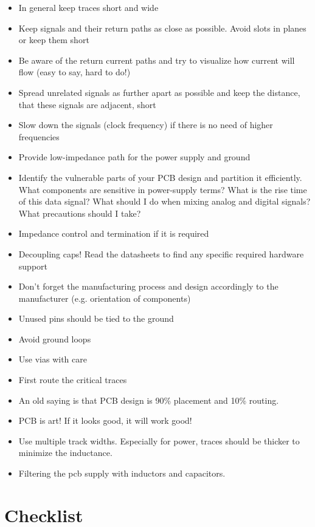 \documentclass[final]{cubedoc}
\begin{document}
	\begin{itemize}
		\item In general keep traces short and wide
		\item Keep signals and their return paths as close as possible. Avoid slots in planes or keep them short
		\item Be aware of the return current paths and try to visualize how current will flow (easy to say, hard to do!)
		\item Spread unrelated signals as further apart as possible and keep the distance, that these signals are adjacent, short
		\item Slow down the signals (clock frequency) if there is no need of higher frequencies
		\item Provide low-impedance path for the power supply and ground
		\item Identify the vulnerable parts of your PCB design and partition it efficiently. What components are sensitive in power-supply terms? What is the rise time of this data signal? What should I do when mixing analog and digital signals? What precautions should I take?
		\item Impedance control and termination if it is required
		\item Decoupling caps!
		\items Read the datasheets to find any specific required hardware support
		\item Don't forget the manufacturing process and design accordingly to the manufacturer (e.g. orientation of components)
		\item Unused pins should be tied to the ground
		\item Avoid ground loops
		\item Use vias with care
		\item First route the critical traces
		\item An old saying is that PCB design is 90\% placement and 10\% routing.
		\item PCB is art! If it looks good, it will work good!
		\item Use multiple track widths. Especially for power, traces should be thicker to minimize the inductance.
		\item Filtering the pcb supply with inductors and capacitors.
	\end{itemize}
	
	\section{Checklist}
	
\end{document}
